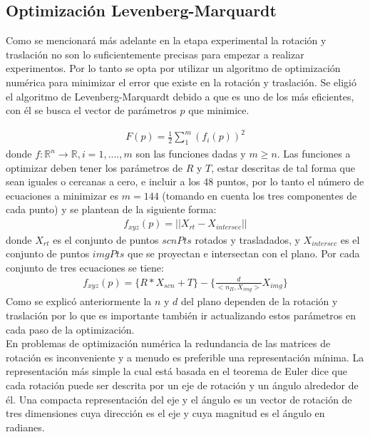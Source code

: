        	
       	\subsection{Optimización Levenberg-Marquardt} \label{opNum}
       	Como se mencionará más adelante en la etapa experimental la rotación y traslación no son lo suficientemente precisas para empezar a realizar experimentos. Por lo tanto se opta por utilizar un algoritmo de optimización numérica para minimizar el error que existe en la rotación y traslación. Se eligió el algoritmo de Levenberg-Marquardt debido a que es uno de los más eficientes, con él se busca el vector de parámetros $p$ que minimice.
       	
       	\begin{eqnarray}
       	F(p)=\frac{1}{2}\sum\limits_1^m(f_i(p))^2	
       	\end{eqnarray}
       	donde $f: \mathbb{R}^n\rightarrow \mathbb{R}, i=1,....,m$ son las funciones dadas y $m\geq n$.     	
       	Las funciones a optimizar deben tener los parámetros de $R$ y $T$, estar descritas de tal forma que sean iguales o cercanas a cero, e incluir a los 48 puntos, por lo tanto el número de ecuaciones a minimizar es $m=144$ (tomando en cuenta los tres componentes de cada punto) y se plantean de la siguiente forma:
       	\begin{eqnarray}
       	f_{xyz}(p)=||X_{rt}-X_{intersec}||
       	\end{eqnarray}
       	donde $X_{rt}$ es el conjunto de puntos $scnPts$ rotados y trasladados, y $X_{intersec}$ es el conjunto de puntos $imgPts$ que se proyectan e intersectan con el plano. Por cada conjunto de tres ecuaciones se tiene:
       	\begin{eqnarray}
       	f_{xyz}(p)= \{R*X_{scn}+T\}-\{ \frac{d}{<n_{\Pi},X_{img}>}X_{img} \}
       	\end{eqnarray}
       	Como se explicó anteriormente la $n$ y $d$ del plano dependen de la rotación y traslación por lo que es importante también ir actualizando estos parámetros en cada paso de la optimización. \\
       	En problemas de optimización numérica la redundancia de las matrices de rotación es inconveniente y a menudo es preferible una representación mínima. La representación más simple la cual está basada en el teorema de Euler dice que cada rotación puede ser descrita por un eje de rotación y un ángulo alrededor de él. Una compacta representación del eje y el ángulo es un vector de rotación de tres dimensiones cuya dirección es el eje y cuya magnitud es el ángulo en radianes.\\
